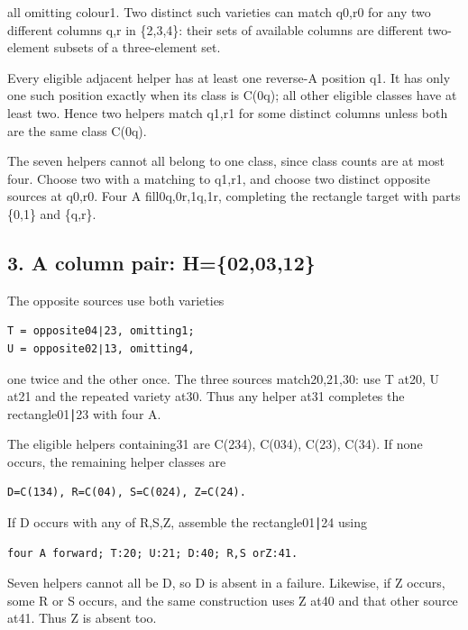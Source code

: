 \documentclass[
  10pt,
]{article}
\begin{document}
all omitting colour1. Two distinct such varieties can match q0,r0 for
any two different columns q,r in \{2,3,4\}: their sets of available
columns are different two-element subsets of a three-element set.

Every eligible adjacent helper has at least one reverse-A position q1.
It has only one such position exactly when its class is C(0q); all other
eligible classes have at least two. Hence two helpers match q1,r1 for
some distinct columns unless both are the same class C(0q).

The seven helpers cannot all belong to one class, since class counts are
at most four. Choose two with a matching to q1,r1, and choose two
distinct opposite sources at q0,r0. Four A fill0q,0r,1q,1r, completing
the rectangle target with parts \{0,1\} and \{q,r\}.

\hypertarget{a-column-pair-h020312}{%
\subsection*{3. A column pair:
H=\{02,03,12\}}\label{a-column-pair-h020312}}

The opposite sources use both varieties

\begin{verbatim}
T = opposite04∣23, omitting1;
U = opposite02∣13, omitting4,
\end{verbatim}

one twice and the other once. The three sources match20,21,30: use T
at20, U at21 and the repeated variety at30. Thus any helper at31
completes the rectangle01∣23 with four A.

The eligible helpers containing31 are C(234), C(034), C(23), C(34). If
none occurs, the remaining helper classes are

\begin{verbatim}
D=C(134), R=C(04), S=C(024), Z=C(24).
\end{verbatim}

If D occurs with any of R,S,Z, assemble the rectangle01∣24 using

\begin{verbatim}
four A forward; T:20; U:21; D:40; R,S orZ:41.
\end{verbatim}

Seven helpers cannot all be D, so D is absent in a failure. Likewise, if
Z occurs, some R or S occurs, and the same construction uses Z at40 and
that other source at41. Thus Z is absent too.
\end{document}
